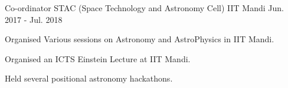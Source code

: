 


\begin{cventries}


\cventry
{Co-ordinator} %
{STAC (Space Technology and Astronomy Cell)} %
{IIT Mandi} %
{Jun. 2017 - Jul. 2018} %
{ %
\begin{cvitems}
\item {Organised Various sessions on Astronomy and AstroPhysics in IIT Mandi.}
\item {Organised an ICTS Einstein Lecture at IIT Mandi.}
\item {Held several positional astronomy hackathons.}
\end{cvitems}
}



\end{cventries}